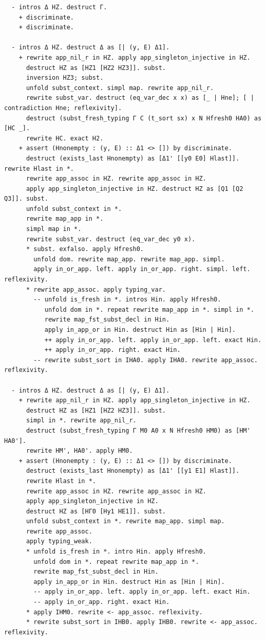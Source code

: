 \begin{latin}
\begin{verbatim}
  - intros Δ HZ. destruct Γ.
    + discriminate.
    + discriminate.

  - intros Δ HZ. destruct Δ as [| (y, E) Δ1].
    + rewrite app_nil_r in HZ. apply app_singleton_injective in HZ.
      destruct HZ as [HZ1 [HZ2 HZ3]]. subst.
      inversion HZ3; subst.
      unfold subst_context. simpl map. rewrite app_nil_r.
      rewrite subst_var. destruct (eq_var_dec x x) as [_ | Hne]; [ | contradiction Hne; reflexivity].
      destruct (subst_fresh_typing Γ C (t_sort sx) x N Hfresh0 HA0) as [HC _].
      rewrite HC. exact H2.
    + assert (Hnonempty : (y, E) :: Δ1 <> []) by discriminate.
      destruct (exists_last Hnonempty) as [Δ1' [[y0 E0] Hlast]]. rewrite Hlast in *.
      rewrite app_assoc in HZ. rewrite app_assoc in HZ.
      apply app_singleton_injective in HZ. destruct HZ as [Q1 [Q2 Q3]]. subst.
      unfold subst_context in *.
      rewrite map_app in *.
      simpl map in *.
      rewrite subst_var. destruct (eq_var_dec y0 x).
      * subst. exfalso. apply Hfresh0.
        unfold dom. rewrite map_app. rewrite map_app. simpl.
        apply in_or_app. left. apply in_or_app. right. simpl. left. reflexivity.
      * rewrite app_assoc. apply typing_var.
        -- unfold is_fresh in *. intros Hin. apply Hfresh0.
           unfold dom in *. repeat rewrite map_app in *. simpl in *.
           rewrite map_fst_subst_decl in Hin.
           apply in_app_or in Hin. destruct Hin as [Hin | Hin].
           ++ apply in_or_app. left. apply in_or_app. left. exact Hin.
           ++ apply in_or_app. right. exact Hin.
        -- rewrite subst_sort in IHA0. apply IHA0. rewrite app_assoc. reflexivity.

  - intros Δ HZ. destruct Δ as [| (y, E) Δ1].
    + rewrite app_nil_r in HZ. apply app_singleton_injective in HZ.
      destruct HZ as [HZ1 [HZ2 HZ3]]. subst.
      simpl in *. rewrite app_nil_r.
      destruct (subst_fresh_typing Γ M0 A0 x N Hfresh0 HM0) as [HM' HA0'].
      rewrite HM', HA0'. apply HM0.
    + assert (Hnonempty : (y, E) :: Δ1 <> []) by discriminate.
      destruct (exists_last Hnonempty) as [Δ1' [[y1 E1] Hlast]].
      rewrite Hlast in *.
      rewrite app_assoc in HZ. rewrite app_assoc in HZ.
      apply app_singleton_injective in HZ.
      destruct HZ as [HΓ0 [Hy1 HE1]]. subst.
      unfold subst_context in *. rewrite map_app. simpl map.
      rewrite app_assoc.
      apply typing_weak.
      * unfold is_fresh in *. intro Hin. apply Hfresh0.
        unfold dom in *. repeat rewrite map_app in *.
        rewrite map_fst_subst_decl in Hin.
        apply in_app_or in Hin. destruct Hin as [Hin | Hin].
        -- apply in_or_app. left. apply in_or_app. left. exact Hin.
        -- apply in_or_app. right. exact Hin.
      * apply IHM0. rewrite <- app_assoc. reflexivity.
      * rewrite subst_sort in IHB0. apply IHB0. rewrite <- app_assoc. reflexivity.


\end{verbatim}
\end{latin}

